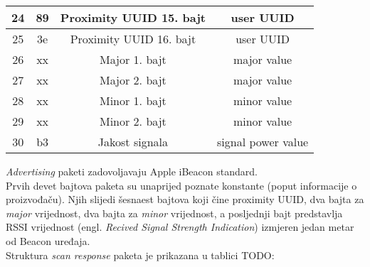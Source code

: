 \begin{table}
\begin{tabular}{|c|c|c|c|}
\hline 
24 & 89 & Proximity UUID 15. bajt & user UUID \\ 
\hline 
25 & 3e & Proximity UUID 16. bajt & user UUID \\ 
\hline 
26 & xx & Major 1. bajt & major value \\ 
\hline 
27 & xx & Major 2. bajt & major value \\ 
\hline 
28 & xx & Minor 1. bajt & minor value \\ 
\hline 
29 & xx & Minor 2. bajt & minor value \\ 
\hline 
30 & b3 & Jakost signala & signal power value \\ 
\hline 
\end{tabular} 
\end{table}
\textit{Advertising} paketi zadovoljavaju Apple iBeacon\textsuperscript{\texttrademark} standard.
\\
Prvih devet bajtova paketa su unaprijed poznate konstante (poput informacije o proizvođaču). Njih slijedi šesnaest bajtova koji čine proximity UUID, dva bajta za \textit{major} vrijednost, dva bajta za \textit{minor} vrijednost, a posljednji bajt predstavlja RSSI vrijednost (engl. \textit{Recived Signal Strength Indication}) izmjeren jedan metar od Beacon uređaja.
\\

Struktura \textit{scan response} paketa je prikazana u tablici TODO:

